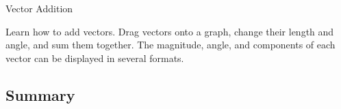 \documentclass[
]{book}
\newenvironment{note}{}{}
\begin{document}
\hypertarget{eip-948}{}
\begin{note}

Vector Addition

Learn how to add vectors. Drag vectors onto a graph, change their length
and angle, and sum them together. The magnitude, angle, and components
of each vector can be displayed in several formats. {\hfill\break
}

\hypertarget{fs-id1167066847646}{}

\end{note}

\hypertarget{fs-id1628255-summary}{}
\hypertarget{summary-2}{%
\subsection{Summary}\label{summary-2}}
\end{document}
